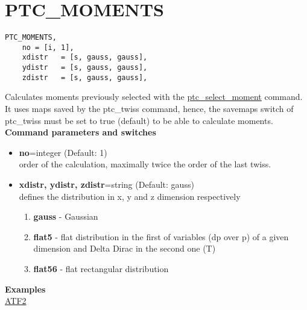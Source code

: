 
\section{PTC\_MOMENTS}

\begin{verbatim}
PTC_MOMENTS, 
    no = [i, 1], 
    xdistr   = [s, gauss, gauss], 
    ydistr   = [s, gauss, gauss], 
    zdistr   = [s, gauss, gauss], 
\end{verbatim}

Calculates moments previously selected with the
\href{PTC_SelectMoment.html}{ptc\_select\_moment} command.  It uses maps
saved by the ptc\_twiss command, hence, the savemaps switch of
ptc\_twiss must be set to true (default) to be able to calculate
moments.  \\ 

{\bf  Command parameters and switches }
\begin{itemize}
   \item {\bf no}=integer (Default: 1)\\
     order of the calculation, maximally twice the order of the last
     twiss.
   
   \item {\bf xdistr, ydistr, zdistr}=string (Default: gauss)\\  
     defines the distribution in x, y and z dimension respectively 
     \begin{enumerate}
	\item {\bf gauss} - Gaussian
	\item {\bf flat5} - flat distribution in the first of
          variables (dp over p) of a given dimension and Delta Dirac in
          the second one (T)  
	\item {\bf flat56} - flat rectangular distribution 
     \end{enumerate}
\end{itemize}

{\bf Examples}\\
\href{http://cern.ch/frs/mad-X_examples/ptc_madx_interface/moments/moments.madx}{ATF2}


% 
